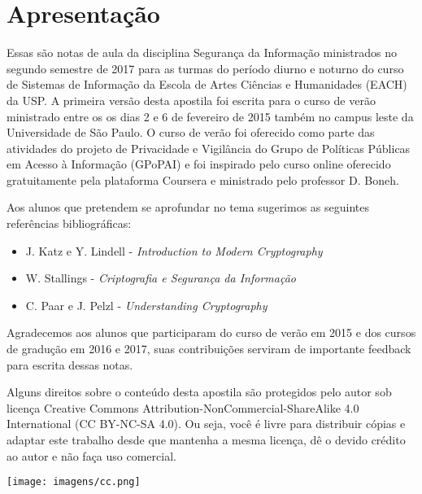 \chapter*{Apresentação}

Essas são notas de aula da disciplina Segurança da Informação ministrados no segundo semestre de 2017 para as turmas do período diurno e noturno do curso de Sistemas de Informação da Escola de Artes Ciências e Humanidades (EACH) da USP.
A primeira versão desta apostila foi escrita para o curso de verão ministrado entre os os dias 2 e 6 de fevereiro de 2015 também no campus leste da Universidade de São Paulo. 
O curso de verão foi oferecido como parte das atividades do projeto de Privacidade e Vigilância do Grupo de Políticas Públicas em Acesso à Informação (GPoPAI) e foi inspirado pelo curso online oferecido gratuitamente pela plataforma Coursera e ministrado pelo professor D. Boneh.

Aos alunos que pretendem se aprofundar no tema sugerimos as seguintes referências bibliográficas:

\begin{itemize}
\item J. Katz e Y. Lindell - {\em Introduction to Modern Cryptography}
\item W. Stallings - {\em Criptografia e Segurança da Informação}
\item C. Paar e J. Pelzl - {\em Understanding Cryptography}
\end{itemize}

Agradecemos aos alunos que participaram do curso de verão em 2015 e dos cursos de gradução em 2016 e 2017, suas contribuições serviram de importante feedback para escrita dessas notas.

Alguns direitos sobre o conteúdo desta apostila são protegidos pelo autor sob licença Creative Commons
Attribution-NonCommercial-ShareAlike 4.0 International (CC BY-NC-SA 4.0). Ou seja, você  é livre para distribuir cópias e adaptar este trabalho desde que mantenha a mesma licença, dê o devido crédito ao autor e não faça uso comercial.

\begin{center}
  \texttt{[image: imagens/cc.png]}
\end{center}